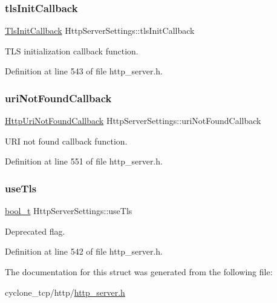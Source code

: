 \subsubsection{\texorpdfstring{tls\+Init\+Callback}{tlsInitCallback}}
{\footnotesize\ttfamily \hyperlink{http__server_8h_a8f99c4f733cd42c09edd9187bd404465}{Tls\+Init\+Callback} Http\+Server\+Settings\+::tls\+Init\+Callback}



T\+LS initialization callback function. 



Definition at line 543 of file http\+\_\+server.\+h.

\mbox{\label{structHttpServerSettings_adc5ffb952164a85c426fd76ffb30f2b2}} 
\subsubsection{\texorpdfstring{uri\+Not\+Found\+Callback}{uriNotFoundCallback}}
{\footnotesize\ttfamily \hyperlink{http__server_8h_a0ddfa4cd52540a0b533e99372ab06c11}{Http\+Uri\+Not\+Found\+Callback} Http\+Server\+Settings\+::uri\+Not\+Found\+Callback}



U\+RI not found callback function. 



Definition at line 551 of file http\+\_\+server.\+h.

\mbox{\label{structHttpServerSettings_aa05a5b60d9277d77f713989774ca3fde}} 
\subsubsection{\texorpdfstring{use\+Tls}{useTls}}
{\footnotesize\ttfamily \hyperlink{compiler__port_8h_a812d16e5494522586b3784e55d479912}{bool\+\_\+t} Http\+Server\+Settings\+::use\+Tls}



Deprecated flag. 



Definition at line 542 of file http\+\_\+server.\+h.



The documentation for this struct was generated from the following file\+:\begin{DoxyCompactItemize}
\item 
cyclone\+\_\+tcp/http/\hyperlink{http__server_8h}{http\+\_\+server.\+h}\end{DoxyCompactItemize}
